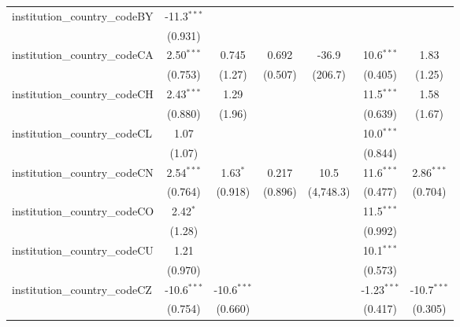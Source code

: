 \begin{tabular}{lcccccc}
   institution\_country\_codeBY          & -11.3$^{***}$  &               &               &            &               &   \\   
                                         & (0.931)        &               &               &            &               &   \\   
   institution\_country\_codeCA          & 2.50$^{***}$   & 0.745         & 0.692         & -36.9      & 10.6$^{***}$  & 1.83\\   
                                         & (0.753)        & (1.27)        & (0.507)       & (206.7)    & (0.405)       & (1.25)\\   
   institution\_country\_codeCH          & 2.43$^{***}$   & 1.29          &               &            & 11.5$^{***}$  & 1.58\\   
                                         & (0.880)        & (1.96)        &               &            & (0.639)       & (1.67)\\   
   institution\_country\_codeCL          & 1.07           &               &               &            & 10.0$^{***}$  &   \\   
                                         & (1.07)         &               &               &            & (0.844)       &   \\   
   institution\_country\_codeCN          & 2.54$^{***}$   & 1.63$^{*}$    & 0.217         & 10.5       & 11.6$^{***}$  & 2.86$^{***}$\\   
                                         & (0.764)        & (0.918)       & (0.896)       & (4,748.3)  & (0.477)       & (0.704)\\   
   institution\_country\_codeCO          & 2.42$^{*}$     &               &               &            & 11.5$^{***}$  &   \\   
                                         & (1.28)         &               &               &            & (0.992)       &   \\   
   institution\_country\_codeCU          & 1.21           &               &               &            & 10.1$^{***}$  &   \\   
                                         & (0.970)        &               &               &            & (0.573)       &   \\   
   institution\_country\_codeCZ          & -10.6$^{***}$  & -10.6$^{***}$ &               &            & -1.23$^{***}$ & -10.7$^{***}$\\   
                                         & (0.754)        & (0.660)       &               &            & (0.417)       & (0.305)\\   

\end{tabular}
